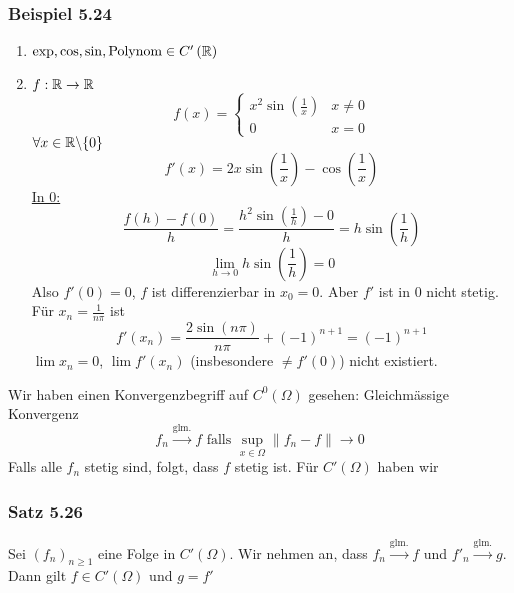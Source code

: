 \subsubsection*{Beispiel 5.24}
\begin{enumerate}
\item $\exp,\cos,\sin,\text{Polynom}\in C'\left( \mathbb{R}\right)$
\item $f:\mathbb{R}\to\mathbb{R}$
\[f\left( x \right) = \left\{ {\begin{array}{*{20}{c}}
{{x^2}\sin \left( {\frac{1}{x}} \right)}&{x\not  = 0}\\
0&{x = 0}
\end{array}} \right.\]
$\forall x\in\mathbb{R}\backslash\{ 0\}$
\[f'\left( x \right) = 2x\sin \left( {\frac{1}{x}} \right) - \cos \left( {\frac{1}{x}} \right)\]
\underline{In 0:}
\[\frac{{f\left( h \right) - f\left( 0 \right)}}{h} = \frac{{{h^2}\sin \left( {\frac{1}{h}} \right) - 0}}{h} = h\sin \left( {\frac{1}{h}} \right)\]
\[\mathop {\lim }\limits_{h \to 0} h\sin \left( {\frac{1}{h}} \right) = 0\]
Also $f'(0)=0$, $f$ ist differenzierbar in $x_0=0$. Aber $f'$ ist in 0 nicht stetig. Für $x_n=\frac{1}{n\pi}$ ist
\[f'\left( {{x_n}} \right) = \frac{{2\sin \left( {n\pi } \right)}}{{n\pi }} + {\left( { - 1} \right)^{n + 1}} = {\left( { - 1} \right)^{n + 1}}\]
$\lim x_n=0$, $\lim f'\left( x_n\right)$ (insbesondere $\not=f'(0)$) nicht existiert.
\end{enumerate}
Wir haben einen Konvergenzbegriff auf $C^0\left( \Omega\right)$ gesehen: Gleichmässige Konvergenz
\[{f_n}\mathop  \to \limits^{\text{glm.}} f{\text{ falls }}\mathop {\sup }\limits_{x \in \Omega } \left\| {{f_n} - f} \right\| \to 0\]
Falls alle $f_n$ stetig sind, folgt, dass $f$ stetig ist. Für $C'\left( \Omega\right)$ haben wir

\subsubsection*{Satz 5.26}\label{satz5.26}
Sei $\left( f_n\right)_{n\geq 1}$ eine Folge in $C'\left( \Omega\right)$. Wir nehmen an, dass ${f_n}\mathop  \to \limits^{\text{glm.}} f$ und ${f'_n}\mathop  \to \limits^{\text{glm.}} g$. Dann gilt $f\in C'\left( \Omega\right)$ und $g=f'$

